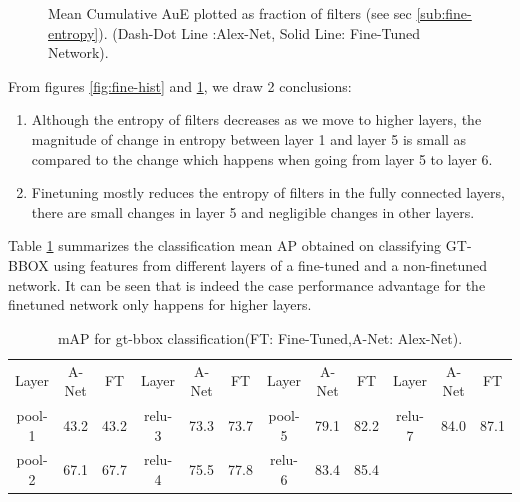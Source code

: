 \documentclass[runningheads]{llncs}
\begin{document}
\begin{figure}[t!]
\centering
{}
\caption{Mean Cumulative AuE plotted as fraction of filters (see sec \ref{sub:fine-entropy}). (Dash-Dot Line :Alex-Net, Solid Line: Fine-Tuned Network).}
\label{fig:fine-entropy}
\end{figure}

From figures \ref{fig:fine-hist} and \ref{fig:fine-entropy}, we draw 2 conclusions:
\begin{enumerate}
\item Although the entropy of filters decreases as we move to higher layers, the magnitude of change in entropy between layer 1 and layer 5 is small as compared to the change which happens when going from layer 5 to layer 6.
\item Finetuning mostly reduces the entropy of filters in the fully connected layers, there are small changes in layer 5 and negligible changes in other layers.
\end{enumerate} 

Table \ref{table:gt-bbox-fine} summarizes the classification mean AP obtained on classifying GT-BBOX  using features from different layers of a fine-tuned and a non-finetuned network. It can be seen that is indeed the case performance advantage for the finetuned network only happens for higher layers.
\setlength{\tabcolsep}{4pt}
\begin{table}[t!]
\begin{center}
\caption{mAP for gt-bbox classification(FT: Fine-Tuned,A-Net: Alex-Net).}
\label{table:gt-bbox-fine}
\begin{tabular}{ccc|ccc|ccc|ccc}
\hline\noalign{\smallskip}
Layer & A-Net & FT & Layer & A-Net & FT & Layer & A-Net & FT & Layer & A-Net & FT \\
\noalign{\smallskip}
\hline
\noalign{\smallskip}
pool-1 & 43.2 & 43.2  & relu-3 & 73.3 & 73.7 & pool-5 & 79.1 & 82.2 & relu-7 & 84.0 & 87.1 \\
pool-2  & 67.1 & 67.7 & relu-4 & 75.5 & 77.8 & relu-6 & 83.4 & 85.4 \\
\hline
\end{tabular}
\end{center}
\end{table}
\setlength{\tabcolsep}{1.4pt}
\end{document}
